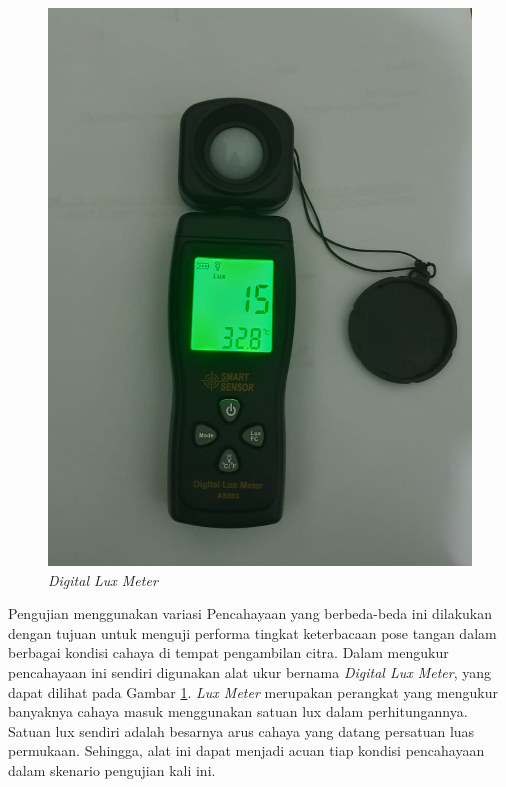 \begin{figure}[!htb]
  \centering
  \includegraphics[scale=0.15]{gambar/lux-meter.jpeg}
  \caption{\emph{Digital Lux Meter}}
  \label{fig:Digital Lux Meter}
\end{figure}

Pengujian menggunakan variasi Pencahayaan yang berbeda-beda ini dilakukan dengan tujuan untuk menguji performa tingkat keterbacaan pose tangan dalam berbagai kondisi cahaya di tempat pengambilan citra. Dalam mengukur pencahayaan ini sendiri digunakan alat ukur bernama \emph{Digital Lux Meter}, yang dapat dilihat pada Gambar \ref{fig:Digital Lux Meter}. \emph{Lux Meter} merupakan perangkat yang mengukur banyaknya cahaya masuk menggunakan satuan lux dalam perhitungannya. Satuan lux sendiri adalah besarnya arus cahaya yang datang persatuan luas permukaan. Sehingga, alat ini dapat menjadi acuan tiap kondisi pencahayaan dalam skenario pengujian kali ini.

